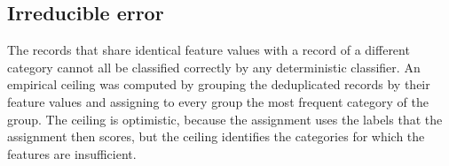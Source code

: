 \subsection{Irreducible error}
\label{sec:ceiling-protocol}

The records that share identical feature values with a record of a different
category cannot all be classified correctly by any deterministic classifier.
An empirical ceiling was computed by grouping the deduplicated records by
their feature values and assigning to every group the most frequent
category of the group. The ceiling is optimistic, because the assignment
uses the labels that the assignment then scores, but the ceiling identifies
the categories for which the features are insufficient.
